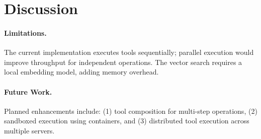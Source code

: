 \section{Discussion}


\paragraph{Limitations.} The current implementation executes tools sequentially; parallel execution would improve throughput for independent operations. The vector search requires a local embedding model, adding memory overhead.

\paragraph{Future Work.} Planned enhancements include: (1) tool composition for multi-step operations, (2) sandboxed execution using containers, and (3) distributed tool execution across multiple servers.

